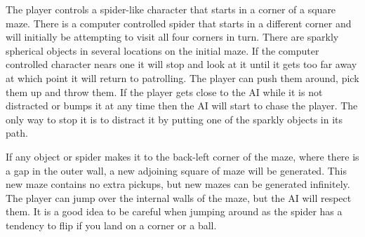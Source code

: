 \documentclass[11pt]{article}
\begin{document}
The player controls a spider-like character that starts in a corner of a square maze. There is a
computer controlled spider that starts in a different corner and will initially be attempting to visit
all four corners in turn. There are sparkly spherical objects in several locations on the initial maze.
If the computer controlled character nears one it will stop and look at it until it gets too far away
at which point it will return to patrolling. The player can push them around, pick them up and throw them.
If the player gets close to the AI while it is not distracted or bumps it at any time then the AI will 
start to chase the player. The only way to stop it is to distract it by putting one of the sparkly objects
in its path.

If any object or spider makes it to the back-left corner of the maze, where there is a gap in the outer
wall, a new adjoining square of maze will be generated. This new maze contains no extra pickups, but new
mazes can be generated infinitely. The player can jump over the internal walls of the maze, but the AI 
will respect them. It is a good idea to be careful when jumping around as the spider has a tendency to 
flip if you land on a corner or a ball.
\end{document}
